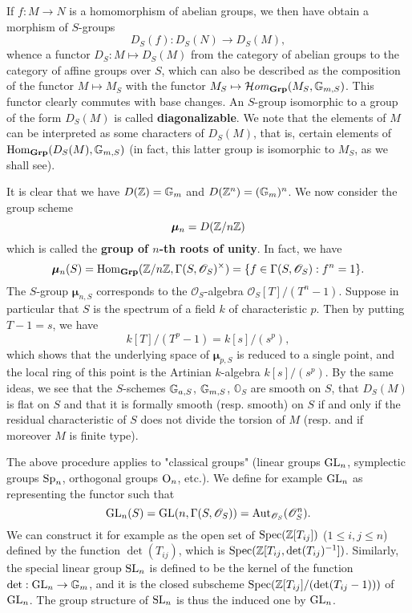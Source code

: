 If $f:M\to N$ is a homomorphism of abelian groups, we then have obtain a morphism of $S$-groups
\[D_S(f):D_S(N)\to D_S(M),\]
whence a functor $D_S:M\mapsto D_S(M)$ from the category of abelian groups to the category of affine groups over $S$, which can also be described as the composition of the functor $M\mapsto M_S$ with the functor $M_S\mapsto\operatorname{\mathcal{H}\hspace*{-0.4pt}\textit{om}\hspace{0.5pt}}_{\mathbf{Grp}}(M_S,\mathbb{G}_{m,S})$. This functor clearly commutes with base changes. An $S$-group isomorphic to a group of the form $D_S(M)$ is called \textbf{diagonalizable}. We note that the elements of $M$ can be interpreted as some characters of $D_S(M)$, that is, certain elements of $\mathrm{Hom}_{\mathbf{Grp}}(D_S(M),\mathbb{G}_{m,S})$ (in fact, this latter group is isomorphic to $M_S$, as we shall see).
\begin{example}
It is clear that we have $D(\mathbb{Z})=\mathbb{G}_m$ and $D(\mathbb{Z}^n)=(\mathbb{G}_m)^n$. We now consider the group scheme
\[\bm{\mu}_n=D(\mathbb{Z}/n\mathbb{Z})\]
which is called the \textbf{group of $n$-th roots of unity}. In fact, we have
\[\bm{\mu}_n(S)=\mathrm{Hom}_{\mathbf{Grp}}(\mathbb{Z}/n\mathbb{Z},\Gamma(S,\mathscr{O}_S)^\times)=\{f\in\Gamma(S,\mathscr{O}_S):f^n=1\}.\]
The $S$-group $\bm{\mu}_{n,S}$ corresponds to the $\mathscr{O}_S$-algebra $\mathscr{O}_S[T]/(T^n-1)$. Suppose in particular that $S$ is the spectrum of a field $k$ of characteristic $p$. Then by putting $T-1=s$, we have
\[k[T]/(T^p-1)=k[s]/(s^p),\]
which shows that the underlying space of $\bm{\mu}_{p,S}$ is reduced to a single point, and the local ring of this point is the Artinian $k$-algebra $k[s]/(s^p)$. By the same ideas, we see that the $S$-schemes $\mathbb{G}_{a,S}$, $\mathbb{G}_{m,S}$, $\mathbb{O}_S$ are smooth on $S$, that $D_S(M)$ is flat on $S$ and that it is formally smooth (resp. smooth) on $S$ if and only if the residual characteristic of $S$ does not divide the torsion of $M$ (resp. and if moreover $M$ is finite type).
\end{example}
\begin{example}
The above procedure applies to "classical groups" (linear groups $\mathrm{GL}_n$, symplectic groups $\mathrm{Sp}_n$, orthogonal groups $\mathrm{O}_n$, etc.). We define for example $\mathrm{GL}_n$ as representing the functor such that
\[\mathrm{GL}_n(S)=\mathrm{GL}(n,\Gamma(S,\mathscr{O}_S))=\mathrm{Aut}_{\mathscr{O}_S}(\mathscr{O}_S^n).\]
We can construct it for example as the open set of $\mathrm{Spec}(\mathbb{Z}[T_{ij}])$ ($1\leq i,j\leq n$) defined by the function $\det(T_{ij})$, which is $\mathrm{Spec}(\mathbb{Z}[T_{ij},\mathrm{det}(T_{ij})^{-1}])$. Similarly, the special linear group $\mathrm{SL}_n$ is defined to be the kernel of the function $\mathrm{det}:\mathrm{GL}_n\to\mathbb{G}_m$, and it is the closed subscheme $\mathrm{Spec}(\mathbb{Z}[T_{ij}]/(\mathrm{det}(T_{ij}-1)))$ of $\mathrm{GL}_n$. The group structure of $\mathrm{SL}_n$ is thus the induced one by $\mathrm{GL}_n$.
\end{example}

